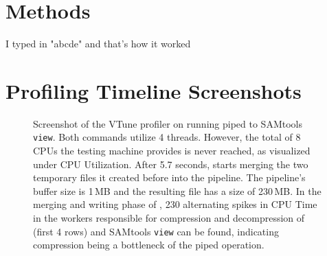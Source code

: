 \appendix
\appendixpage
\addappheadtotoc
\section{Methods}

I typed in "abcde" and that's how it worked


\section{Profiling Timeline Screenshots}

\begin{figure}
\caption{Screenshot of the VTune profiler on running \sort piped to SAMtools \texttt{view}. Both commands utilize 4 threads. However, the total of 8 CPUs the testing machine provides is never reached, as visualized under CPU Utilization. After 5.7 seconds, \sort starts merging the two temporary files it created before into the pipeline. The pipeline's buffer size is 1\,MB and the resulting file has a size of 230\,MB. In the merging and writing phase of \sort, 230 alternating spikes in CPU Time in the workers responsible for compression and decompression of \sort (first 4 rows) and SAMtools \texttt{view} can be found, indicating compression being a bottleneck of the piped operation.} \label{fig1}
\end{figure}



\newpage